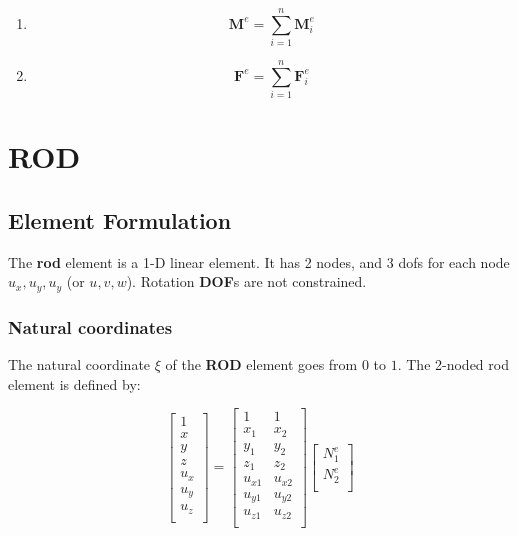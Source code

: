 \documentclass[10pt,b5paper,titlepage]{book}
\newcommand{\m}{\mathbf}
\begin{document}
\begin{enumerate}
\begin{enumerate}
            \item \begin{equation}
                    \m{M}^e = \sum_{i=1}^n \m{M}_i^e
                \end{equation}

            \item \begin{equation}
                    \m{F}^e = \sum_{i=1}^n \m{F}_i^e
                \end{equation}
        \end{enumerate}
\end{enumerate}


\newpage
\section{ROD}

\subsection{Element Formulation}
The \textbf{rod} element is a 1-D linear element. It has 2 nodes, and 3 dofs for
each node $ u_x, u_y, u_y $ (or $ u, v, w $). Rotation \textbf{DOF}s are not
constrained.

\subsubsection{Natural coordinates}
The natural coordinate $ \xi $ of the \textbf{ROD} element goes from $ 0 $ to $ 1 $.
The 2-noded rod element is defined by:

\begin{equation}
    \begin{bmatrix}
        1 \\
        x \\
        y \\
        z \\
        u_x \\
        u_y \\
        u_z \\
    \end{bmatrix}
    = \begin{bmatrix}
        1 & 1 \\
        x_1 & x_2 \\
        y_1 & y_2 \\
        z_1 & z_2 \\
        u_{x1} & u_{x2} \\
        u_{y1} & u_{y2} \\
        u_{z1} & u_{z2} \\
    \end{bmatrix}
    \begin{bmatrix}
        N_1^e \\
        N_2^e \\
    \end{bmatrix}
\end{equation}
\end{document}
